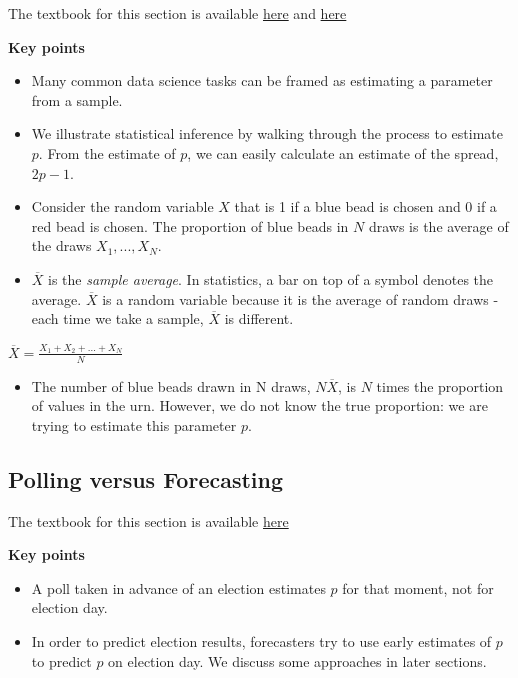 \documentclass[
]{article}
\providecommand{\tightlist}{%
  \setlength{\itemsep}{0pt}\setlength{\parskip}{0pt}}
\begin{document}
The textbook for this section is available
\href{https://rafalab.github.io/dsbook/inference.html\#the-sample-average}{here}
and
\href{https://rafalab.github.io/dsbook/inference.html\#parameters}{here}

\textbf{Key points}

\begin{itemize}
\tightlist
\item
  Many common data science tasks can be framed as estimating a parameter
  from a sample.
\item
  We illustrate statistical inference by walking through the process to
  estimate \(p\). From the estimate of \(p\), we can easily calculate an
  estimate of the spread, \(2p - 1\).
\item
  Consider the random variable \(X\) that is 1 if a blue bead is chosen
  and 0 if a red bead is chosen. The proportion of blue beads in \(N\)
  draws is the average of the draws \(X_1,...,X_N\).
\item
  \(\overline{X}\) is the \emph{sample average}. In statistics, a bar on
  top of a symbol denotes the average. \(\overline{X}\) is a random
  variable because it is the average of random draws - each time we take
  a sample, \(\overline{X}\) is different.
\end{itemize}

\(\overline{X} = \frac{X_1+X_2+...+X_N}{N}\)

\begin{itemize}
\tightlist
\item
  The number of blue beads drawn in N draws, \(N \overline{X}\), is
  \(N\) times the proportion of values in the urn. However, we do not
  know the true proportion: we are trying to estimate this parameter
  \(p\).
\end{itemize}

\hypertarget{polling-versus-forecasting}{%
\subsection{Polling versus
Forecasting}\label{polling-versus-forecasting}}

The textbook for this section is available
\href{https://rafalab.github.io/dsbook/inference.html\#polling-versus-forecasting}{here}

\textbf{Key points}

\begin{itemize}
\tightlist
\item
  A poll taken in advance of an election estimates \(p\) for that
  moment, not for election day.
\item
  In order to predict election results, forecasters try to use early
  estimates of \(p\) to predict \(p\) on election day. We discuss some
  approaches in later sections.
\end{itemize}
\end{document}
